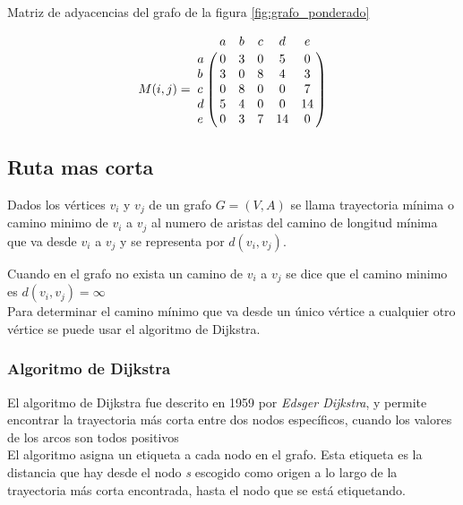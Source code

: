         \begin{table}[!ht]
          \label{tab:matriz}
          \begin{center}
            \caption{Matriz de adyacencias del grafo de la figura  \ref{fig:grafo_ponderado}}
            \begin{displaymath}
              M(i,j) =
              \bordermatrix{ ~ & a & b & c & d & e \cr
                             a & 0 & 3 & 0 & 5 & 0 \cr
                             b & 3 & 0 & 8 & 4 & 3 \cr
                             c & 0 & 8 & 0 & 0 & 7 \cr
                             d & 5 & 4 & 0 & 0 & 14\cr
                             e & 0 & 3 & 7 & 14& 0  }
            \end{displaymath}
          \end{center}
        \end{table}



    \subsection{Ruta mas corta} %
    \label{sub:ruta_mas_corta}
      Dados los vértices $v_{i}$ y $v_{j}$ de un grafo $G = (V,A)$ se llama trayectoria mínima o camino minimo  de \(v_i\) a \(v_j\) al numero de aristas del camino de longitud mínima que va desde $v_i$ a $v_j$ y se representa por $d(v_i, v_j)$.

      Cuando en el grafo no exista un camino de $v_i$ a $v_j$ se dice que el camino minimo es $d(v_i, v_j) = \infty$ \\

      Para determinar el camino mínimo que va desde un único vértice a cualquier otro vértice se puede usar el algoritmo de Dijkstra.



      \subsubsection{Algoritmo de Dijkstra} %
      \label{sub:algoritmo_de_dijkstra}
      El algoritmo de  Dijkstra fue descrito en 1959 por \emph{Edsger Dijkstra}, y permite encontrar la trayectoria más corta entre dos nodos específicos, cuando los valores de los arcos son todos positivos\\

      El algoritmo asigna un etiqueta a cada nodo en el grafo. Esta etiqueta es la distancia que hay desde el nodo \emph{s} escogido como origen a lo largo de la trayectoria más corta encontrada, hasta el nodo que se está etiquetando.\\

